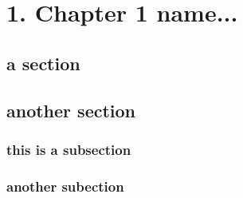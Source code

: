 \chapter{1. Chapter 1 name...}

\lipsum[2]

\section{a section}

\lipsum[1]


\section{another section}

\lipsum[1]

\subsection{this is a subsection}

\lipsum[2]

\subsection{another subection}

\lipsum[3]
